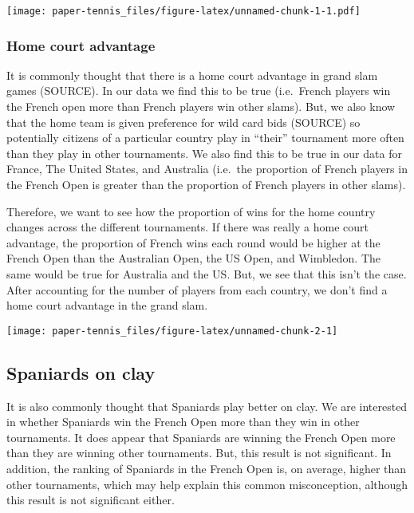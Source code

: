 \documentclass[]{article}
\begin{document}
\texttt{[image: paper-tennis\_files/figure-latex/unnamed-chunk-1-1.pdf]}

\hypertarget{home-court-advantage}{%
\subsubsection{Home court advantage}\label{home-court-advantage}}

It is commonly thought that there is a home court advantage in grand
slam games (SOURCE). In our data we find this to be true (i.e.~French
players win the French open more than French players win other slams).
But, we also know that the home team is given preference for wild card
bids (SOURCE) so potentially citizens of a particular country play in
``their'' tournament more often than they play in other tournaments. We
also find this to be true in our data for France, The United States, and
Australia (i.e.~the proportion of French players in the French Open is
greater than the proportion of French players in other slams).

Therefore, we want to see how the proportion of wins for the home
country changes across the different tournaments. If there was really a
home court advantage, the proportion of French wins each round would be
higher at the French Open than the Australian Open, the US Open, and
Wimbledon. The same would be true for Australia and the US. But, we see
that this isn't the case. After accounting for the number of players
from each country, we don't find a home court advantage in the grand
slam.

\begin{center}\texttt{[image: paper-tennis\_files/figure-latex/unnamed-chunk-2-1]} \end{center}

\hypertarget{spaniards-on-clay}{%
\subsection{Spaniards on clay}\label{spaniards-on-clay}}

It is also commonly thought that Spaniards play better on clay. We are
interested in whether Spaniards win the French Open more than they win
in other tournaments. It does appear that Spaniards are winning the
French Open more than they are winning other tournaments. But, this
result is not significant. In addition, the ranking of Spaniards in the
French Open is, on average, higher than other tournaments, which may
help explain this common misconception, although this result is not
significant either.
\end{document}
